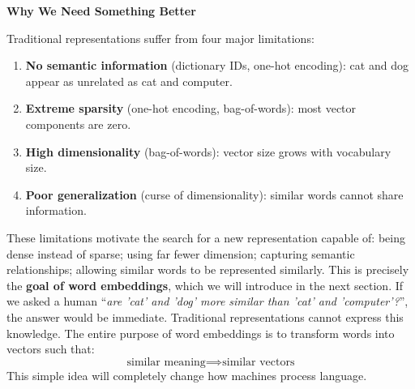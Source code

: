 \highspace
\begin{flushleft}
    \textcolor{Green3}{ \textbf{Why We Need Something Better}}
\end{flushleft}
Traditional representations suffer from four major limitations:
\begin{enumerate}
    \item \textbf{No semantic information} (dictionary IDs, one-hot encoding): cat and dog appear as unrelated as cat and computer.
    \item \textbf{Extreme sparsity} (one-hot encoding, bag-of-words): most vector components are zero.
    \item \textbf{High dimensionality} (bag-of-words): vector size grows with vocabulary size.
    \item \textbf{Poor generalization} (curse of dimensionality): similar words cannot share information.
\end{enumerate}
These limitations motivate the search for a new representation capable of: being dense instead of sparse; using far fewer dimension; capturing semantic relationships; allowing similar words to be represented similarly. This is precisely the \textbf{goal of word embeddings}, which we will introduce in the next section. If we asked a human ``\emph{are 'cat' and 'dog' more similar than 'cat' and 'computer'?}'', the answer would be immediate. Traditional representations cannot express this knowledge. The entire purpose of word embeddings is to transform words into vectors such that:
\begin{equation*}
    \text{similar meaning} \implies \text{similar vectors}
\end{equation*}
This simple idea will completely change how machines process language.